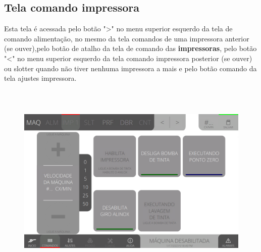 \thispagestyle{fancy}
\vspace*{40 pt}
\subsection{Tela comando impressora}\label{telaComandoImpressora}
 Esta tela é acessada pelo botão "\textgreater" no menu superior esquerdo da tela de comando alimentação, no mesmo da tela comandos de uma impressora anterior (se ouver),pelo botão de atalho da tela de comando das
\textbf{impressoras}, pelo botão "\textless{}" no menu superior esquerdo da tela comando impressora posterior (se ouver) ou slotter quando não tiver nenhuma impressora a mais e pelo botão comando da tela ajustes impressora.
\vspace*{\fill}
\begin{figure}[h]
  \centering
  \includegraphics[width=576px,height=360px]{src/imagesFlexo/04-printter/02-printter/commands/e-Tela-Principal.png}
\end{figure}
\vspace*{\fill}

\newpage
\thispagestyle{fancy}
\vspace*{40 pt}
